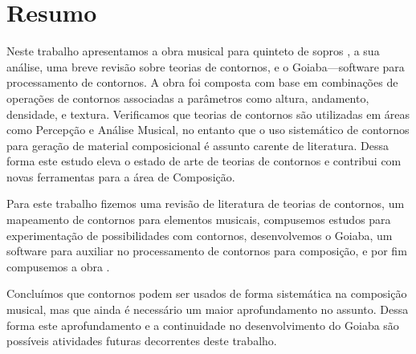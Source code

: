 \chapter*{Resumo}
\label{cha:resumo}

Neste trabalho apresentamos a obra musical para quinteto de sopros
\obra{}, a sua análise, uma breve revisão sobre teorias de contornos,
e o Goiaba---software para processamento de contornos. A obra foi
composta com base em combinações de operações de contornos associadas
a parâmetros como altura, andamento, densidade, e textura. Verificamos
que teorias de contornos são utilizadas em áreas como Percepção e
Análise Musical, no entanto que o uso sistemático de contornos para
geração de material composicional é assunto carente de
literatura. Dessa forma este estudo eleva o estado de arte de teorias
de contornos e contribui com novas ferramentas para a área de
Composição.

Para este trabalho fizemos uma revisão de literatura de teorias de
contornos, um mapeamento de contornos para elementos musicais,
compusemos estudos para experimentação de possibilidades com
contornos, desenvolvemos o Goiaba, um software para auxiliar no
processamento de contornos para composição, e por fim compusemos a
obra \obra{}.

Concluímos que contornos podem ser usados de forma sistemática na
composição musical, mas que ainda é necessário um maior aprofundamento
no assunto. Dessa forma este aprofundamento e a continuidade no
desenvolvimento do Goiaba são possíveis atividades futuras decorrentes
deste trabalho.
